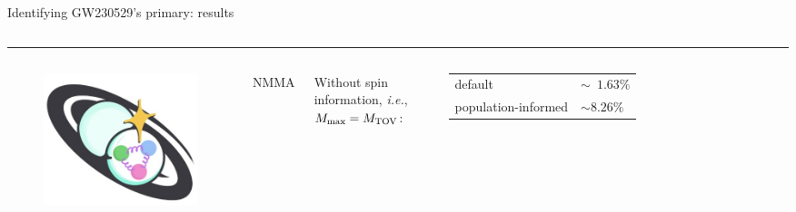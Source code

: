\documentclass[usenames,dvipsnames,t]{beamer}
\begin{document}
\begin{frame}{Identifying GW230529's primary: results}
\begin{minipage}[t][\heightlvk]{\textwidth}
\begin{columns}
    \end{columns}
    \end{minipage}

    \hrule

    \vspace{1mm}

    \pause

    \vspace{1mm}

    \begin{minipage}[t][\heightnmma]{\textwidth}
      \begin{columns}
  
        \begin{figure}[t]
          \centering
          \includegraphics[width=\linewidth]{Figures/NMMA logo.jpg}
        \end{figure}
        \begin{center}
          \textsc{NMMA}

          \scriptsize{}
        \end{center}
    
  
        Without spin information, \textit{i.e.}, $M_{\rm{max}} = M_{\rm{TOV}}$:

        \begin{table}
          \centering
          \begin{tabular}{| p{\mycolwidth} | p{\mycolwidthh} |}
            \hline
            default & $\sim \phantom{0}1.63\%$ \\
            population-informed & $\sim 8.26\%$ \\
            \hline
          \end{tabular}
        \end{table}


\end{columns}
\end{minipage}
\end{frame}
\end{document}

